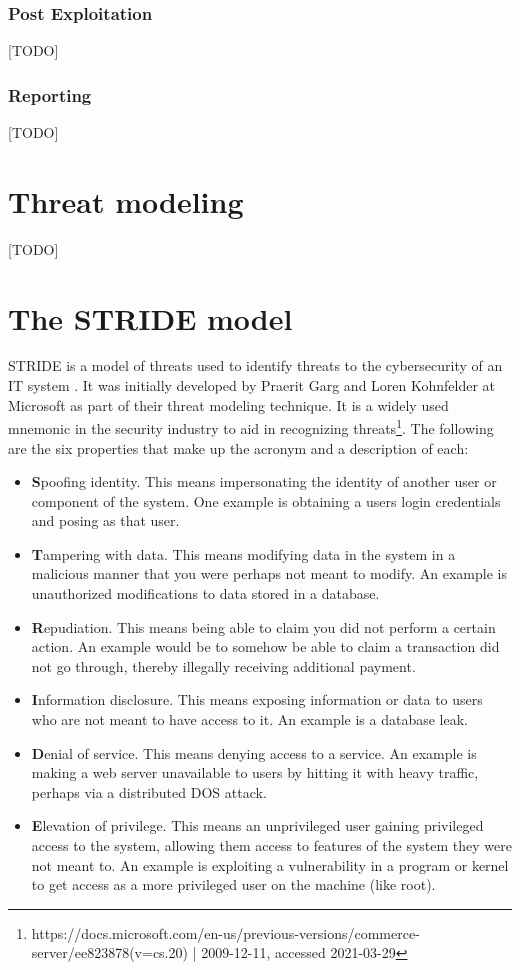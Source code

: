 \subsubsection{Post Exploitation}
[TODO]

\subsubsection{Reporting}
[TODO]


\section{Threat modeling} \label{ch:method:threat-modeling}
[TODO]

\section{The STRIDE model} \label{ch:method:stride}
STRIDE is a model of threats used to identify threats to the cybersecurity of an IT system \cite{stride}. It was initially developed by Praerit Garg and Loren Kohnfelder at Microsoft as part of their threat modeling technique. It is a widely used mnemonic in the security industry to aid in recognizing threats\footnote{https://docs.microsoft.com/en-us/previous-versions/commerce-server/ee823878(v=cs.20) | 2009-12-11, accessed 2021-03-29}. The following are the six properties that make up the acronym and a description of each:
\begin{itemize}
    \item \textbf{S}poofing identity. This means impersonating the identity of another user or component of the system. One example is obtaining a users login credentials and posing as that user.
    \item \textbf{T}ampering with data. This means modifying data in the system in a malicious manner that you were perhaps not meant to modify. An example is unauthorized modifications to data stored in a database.
    \item \textbf{R}epudiation. This means being able to claim you did not perform a certain action. An example would be to somehow be able to claim a transaction did not go through, thereby illegally receiving additional payment.
    \item \textbf{I}nformation disclosure. This means exposing information or data to users who are not meant to have access to it. An example is a database leak.
    \item \textbf{D}enial of service. This means denying access to a service. An example is making a web server unavailable to users by hitting it with heavy traffic, perhaps via a distributed \gls{DOS} attack.
    \item \textbf{E}levation of privilege. This means an unprivileged user gaining privileged access to the system, allowing them access to features of the system they were not meant to. An example is exploiting a vulnerability in a program or kernel to get access as a more privileged user on the machine (like root).
\end{itemize}
